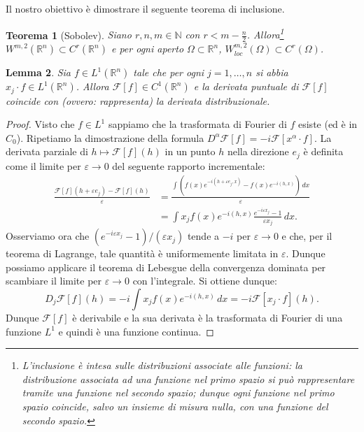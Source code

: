\documentclass[italian,a4paper,oneside,headinclude]{scrbook}
\newcommand{\eps}{\varepsilon}
\newcommand{\loc}{\mathit{loc}}
\newcommand{\F}{\mathcal F}
\newcommand{\NN}{\mathbb N}
\newcommand{\RR}{\mathbb R}
\newtheorem{theorem}{Teorema}
\newtheorem{lemma}[theorem]{Lemma}
\begin{document}
  Il nostro obiettivo è dimostrare il seguente teorema di inclusione.

  \begin{theorem}[Sobolev]\label{th:sobolev_W}
    Siano $r,n,m \in \NN$ con
    $r < m -  \frac{n}{2}$.
    Allora\footnote{%
    L'inclusione è intesa sulle distribuzioni associate alle funzioni:
    la distribuzione associata ad una funzione nel primo
    spazio si può rappresentare tramite una funzione nel secondo
    spazio; dunque ogni funzione nel primo spazio coincide, salvo un
    insieme di misura nulla, con una funzione del secondo spazio.
    }
    $W^{m,2}(\RR^n) \subset C^r(\RR^n)$
    e per ogni aperto $\Omega\subset \RR^n$,
    $W^{m,2}_\loc(\Omega)\subset C^r(\Omega)$.
  \end{theorem}

  \begin{lemma}
    Sia $f\in L^1(\RR^n)$ tale che per ogni $j=1,\dots,n$ si abbia
    $x_j\cdot f\in L^1(\RR^n)$. Allora $\F[f]\in C^1(\RR^n)$ e la
    derivata puntuale di $\F[f]$ coincide con (ovvero: rappresenta)
    la derivata distribuzionale.
  \end{lemma}
  \begin{proof}
    Visto che $f\in L^1$ sappiamo che la trasformata di Fourier di
    $f$ esiste (ed è in $C_0$).
    Ripetiamo la dimostrazione della formula
    $D^\alpha \F[f] = -i \F[x^\alpha\cdot f]$.
    La derivata parziale di $h\mapsto \F[f](h)$ in un punto $h$
    nella direzione $e_j$
    è definita come
    il limite per $\eps\to 0$ del seguente rapporto incrementale:
    \begin{align*}
      \frac{\F[f](h+\eps e_j)-\F[f](h)}{\eps}
      &= \frac{\displaystyle \int \left(f(x) e^{-i(h+\eps
          e_j,x)}-f(x)e^{-i(h,x)}\right)\,
        dx}{\eps}\\
      &= \int x_j f(x)e^{-i(h,x)}\frac{e^{-i\eps x_j}-1}{\eps x_j}\, dx.
    \end{align*}
    Osserviamo ora che $(e^{-i\eps x_j}-1)/(\eps x_j)$ tende a $-i$
    per $\eps\to 0$ e che, per il teorema di Lagrange,
    tale quantità è uniformemente limitata in $\eps$.
    Dunque possiamo applicare il teorema di Lebesgue della convergenza
    dominata per scambiare il limite per $\eps \to 0$ con
    l'integrale.
    Si ottiene dunque:
    \[
    D_j \F[f] (h) = -i\int x_j f(x)
    e^{-i(h,x)}\, dx = -i \F[x_j\cdot f](h).
    \]
    Dunque $\F[f]$ è derivabile e la sua derivata è la trasformata di
    Fourier di una funzione $L^1$ e quindi è una funzione continua.
  \end{proof}
\end{document}
